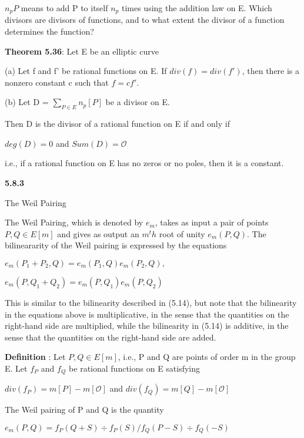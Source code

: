 \documentclass[titlepage]{article}
\begin{document}
$n_pP$ means to add P to itself $n_p$ times using the addition law on E. Which divisors are divisors of functions, and to what extent the divisor of a function determines the function? 

\textbf{Theorem 5.36}: Let E be an elliptic curve

(a) Let f and f' be rational functions on E. If $div(f) = div(f')$, then there is a nonzero constant c such that $f=cf'$. \

(b) Let D =  $\sum\limits_{P\in E} n_p[P]$ be a divisor on E.

 Then D is the divisor of a rational function on E if and only if 
\begin{center}
$deg(D) = 0$ and $Sum(D) = \mathcal{O}$
\end{center} 

i.e., if a rational function on E has no zeros or no poles, then it is a constant.

\textbf{5.8.3} 

The Weil Pairing

\vspace{5mm} 
 The Weil Pairing, which is denoted by $e_m$, takes as input a pair of points $P,Q \in E[m]$ and gives as output an $m^th$ root of unity $e_m(P,Q)$. The bilineararity of the Weil pairing is expressed by the equations 
 
 \begin{center} 
 $e_m(P_1 + P_2, Q) = e_m(P_1,Q)e_m(P_2,Q),$	
 									
 													
 $e_m(P, Q_1 + Q_2) = e_m(P,Q_1)e_m(P,Q_2)$		
 
\end{center}
This is similar to the bilinearity described in (5.14), but note that
the bilinearity in the equations above is multiplicative, in the sense that the quantities on the right-hand side are multiplied, while the bilinearity in (5.14) is additive, in the sense that the quantities on the right-hand side are added.

\textbf{Definition} : Let $P,Q \in E[m]$, i.e., P and Q are points of order m in the group E. Let $f_P$ and $f_Q$ be rational functions on E satisfying 

\begin{center} 
$div(f_P)=m[P]-m[\mathcal{O}]$ and $div(f_Q) = m[Q] - m[\mathcal{O}]$
\end{center}

The Weil pairing of P and Q is the quantity 

\begin{center}
$e_m(P,Q) = f_P(Q+S) \div f_P(S) / f_Q(P-S) \div f_Q(-S)$
\end{center}
\end{document}
